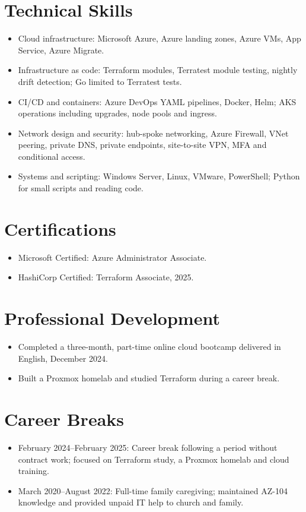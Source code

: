 \documentclass[11pt,a4paper]{article}
\newcommand{\cvsection}[1]{\section*{#1}}
\begin{document}
\newpage
\cvsection{Technical Skills}
\begin{itemize}
\item Cloud infrastructure: Microsoft Azure, Azure landing zones, Azure VMs, App Service, Azure Migrate.
\item Infrastructure as code: Terraform modules, Terratest module testing, nightly drift detection; Go limited to Terratest tests.
\item CI/CD and containers: Azure DevOps YAML pipelines, Docker, Helm; AKS operations including upgrades, node pools and ingress.
\item Network design and security: hub-spoke networking, Azure Firewall, VNet peering, private DNS, private endpoints, site-to-site VPN, MFA and conditional access.
\item Systems and scripting: Windows Server, Linux, VMware, PowerShell; Python for small scripts and reading code.
\end{itemize}

\cvsection{Certifications}
\begin{itemize}
\item Microsoft Certified: Azure Administrator Associate.
\item HashiCorp Certified: Terraform Associate, 2025.
\end{itemize}

\cvsection{Professional Development}
\begin{itemize}
\item Completed a three-month, part-time online cloud bootcamp delivered in English, December 2024.
\item Built a Proxmox homelab and studied Terraform during a career break.
\end{itemize}

\cvsection{Career Breaks}
\begin{itemize}
\item February 2024–February 2025: Career break following a period without contract work; focused on Terraform study, a Proxmox homelab and cloud training.
\item March 2020–August 2022: Full-time family caregiving; maintained AZ-104 knowledge and provided unpaid IT help to church and family.
\end{itemize}
\end{document}
